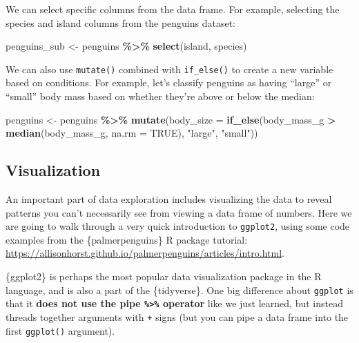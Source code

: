 \documentclass[
]{article}
\newenvironment{Shaded}{\begin{snugshade}}{\end{snugshade}}
\newcommand{\AttributeTok}[1]{\textcolor[rgb]{0.13,0.29,0.53}{#1}}
\newcommand{\ConstantTok}[1]{\textcolor[rgb]{0.56,0.35,0.01}{#1}}
\newcommand{\FunctionTok}[1]{\textcolor[rgb]{0.13,0.29,0.53}{\textbf{#1}}}
\newcommand{\NormalTok}[1]{#1}
\newcommand{\OtherTok}[1]{\textcolor[rgb]{0.56,0.35,0.01}{#1}}
\newcommand{\SpecialCharTok}[1]{\textcolor[rgb]{0.81,0.36,0.00}{\textbf{#1}}}
\newcommand{\StringTok}[1]{\textcolor[rgb]{0.31,0.60,0.02}{#1}}
\begin{document}
We can select specific columns from the data frame. For example,
selecting the species and island columns from the penguins dataset:

\begin{Shaded}
\begin{Highlighting}[]
\NormalTok{penguins\_sub }\OtherTok{\textless{}{-}}\NormalTok{ penguins }\SpecialCharTok{\%\textgreater{}\%}
  \FunctionTok{select}\NormalTok{(island, species)}
\end{Highlighting}
\end{Shaded}

We can also use \texttt{mutate()} combined with \texttt{if\_else()} to
create a new variable based on conditions. For example, let's classify
penguins as having ``large'' or ``small'' body mass based on whether
they're above or below the median:

\begin{Shaded}
\begin{Highlighting}[]
\NormalTok{penguins }\OtherTok{\textless{}{-}}\NormalTok{ penguins }\SpecialCharTok{\%\textgreater{}\%}
  \FunctionTok{mutate}\NormalTok{(}\AttributeTok{body\_size =} \FunctionTok{if\_else}\NormalTok{(body\_mass\_g }\SpecialCharTok{\textgreater{}} \FunctionTok{median}\NormalTok{(body\_mass\_g, }\AttributeTok{na.rm =} \ConstantTok{TRUE}\NormalTok{), }
                            \StringTok{"large"}\NormalTok{, }
                            \StringTok{"small"}\NormalTok{))}
\end{Highlighting}
\end{Shaded}

\subsection{Visualization}\label{visualization}

An important part of data exploration includes visualizing the data to
reveal patterns you can't necessarily see from viewing a data frame of
numbers. Here we are going to walk through a very quick introduction to
\texttt{ggplot2}, using some code examples from the \{palmerpenguins\} R
package tutorial:
\url{https://allisonhorst.github.io/palmerpenguins/articles/intro.html}.

\{ggplot2\} is perhaps the most popular data visualization package in
the R language, and is also a part of the \{tidyverse\}. One big
difference about \texttt{ggplot} is that it \textbf{does not use the
pipe \texttt{\%\textgreater{}\%} operator} like we just learned, but
instead threads together arguments with \texttt{+} signs (but you can
pipe a data frame into the first \texttt{ggplot()} argument).
\end{document}
